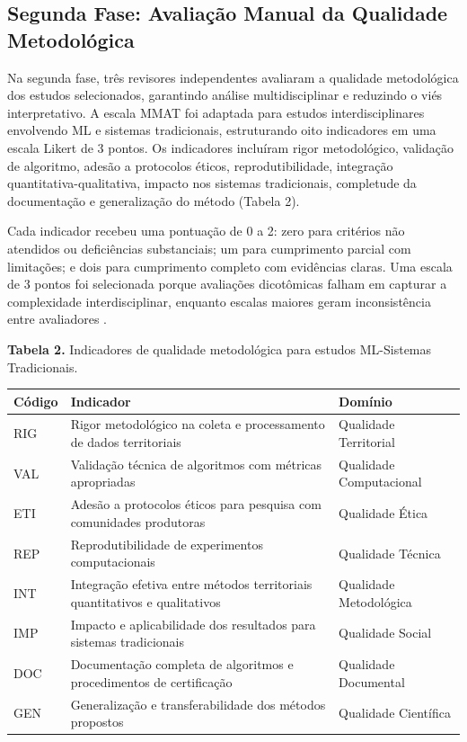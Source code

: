 \subsection{Segunda Fase: Avaliação Manual da Qualidade Metodológica}

Na segunda fase, três revisores independentes avaliaram a qualidade metodológica dos estudos selecionados, garantindo análise multidisciplinar e reduzindo o viés interpretativo. A escala MMAT  \cite{hong2018,pluye2009} foi adaptada para estudos interdisciplinares envolvendo ML e sistemas tradicionais, estruturando oito indicadores em uma escala Likert de 3 pontos. Os indicadores incluíram rigor metodológico, validação de algoritmo, adesão a protocolos éticos, reprodutibilidade, integração quantitativa-qualitativa, impacto nos sistemas tradicionais, completude da documentação e generalização do método (Tabela 2).

Cada indicador recebeu uma pontuação de 0 a 2: zero para critérios não atendidos ou deficiências substanciais; um para cumprimento parcial com limitações; e dois para cumprimento completo com evidências claras. Uma escala de 3 pontos foi selecionada porque avaliações dicotômicas falham em capturar a complexidade interdisciplinar, enquanto escalas maiores geram inconsistência entre avaliadores  \cite{Likert3vs52025}.

\textbf{Tabela 2.} Indicadores de qualidade metodológica para estudos ML-Sistemas Tradicionais.

\begin{table}[h]
\centering
\small
\begin{tabular}{|p{1.5cm}|p{7cm}|p{3.5cm}|}
\hline
Código & Indicador & Domínio \\ \hline
RIG & Rigor metodológico na coleta e processamento de dados territoriais & Qualidade Territorial \\ \hline
VAL & Validação técnica de algoritmos com métricas apropriadas & Qualidade Computacional \\ \hline
ETI & Adesão a protocolos éticos para pesquisa com comunidades produtoras & Qualidade Ética \\ \hline
REP & Reprodutibilidade de experimentos computacionais & Qualidade Técnica \\ \hline
INT & Integração efetiva entre métodos territoriais quantitativos e qualitativos & Qualidade Metodológica \\ \hline
IMP & Impacto e aplicabilidade dos resultados para sistemas tradicionais & Qualidade Social \\ \hline
DOC & Documentação completa de algoritmos e procedimentos de certificação & Qualidade Documental \\ \hline
GEN & Generalização e transferabilidade dos métodos propostos & Qualidade Científica \\ \hline
\end{tabular}
\end{table}

